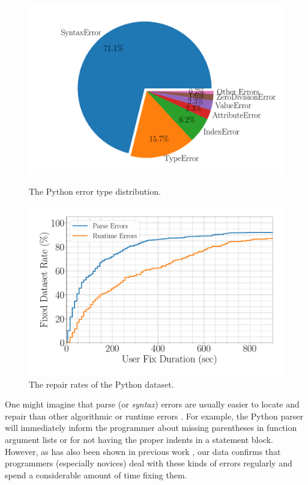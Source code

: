 \begin{figure}[t]
  \centering
  \begin{minipage}[c]{0.48\linewidth}
    \centering
    \includegraphics[width=\linewidth]{error-pie.pdf}
    \caption{The Python error type distribution.}
    \label{fig:error-statistics}
  \end{minipage}
  \hspace{0.02\linewidth}
  \begin{minipage}[c]{0.48\linewidth}
      \centering
      \includegraphics[width=\linewidth]{fixed-rate.pdf}
      \caption{The repair rates of the Python dataset.}
      \label{fig:repair-rate}
  \end{minipage}
\end{figure}

One might imagine that parse (or \emph{syntax}) errors are
usually easier to locate and repair than other algorithmic
or runtime errors \citep{Denny_2012}.
%
For example, the Python parser will immediately inform the programmer
about missing parentheses in function argument lists or for not having
the proper indents in a statement block.
%
However, as has also been shown in previous
work \citep{Ahadi_2018, Kummerfeld2003}, our
data confirms that programmers (especially novices)
deal with these kinds of errors regularly and
spend a considerable amount of time fixing them.

